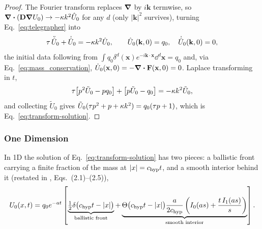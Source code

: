 \begin{proof}
The Fourier transform replaces $\grad$ by $i\mathbf k$ termwise, so
$\div(\mathbf{D}\grad U_0)\to-\kappa k^2\hat U_0$ for any $d$ (only $|\mathbf
k|^2$ survives), turning Eq.~\eqref{eq:telegrapher} into
\begin{equation}
  \tau\,\ddot{\hat U}_0 + \dot{\hat U}_0 = -\kappa k^2\hat U_0 ,
  \qquad \hat U_0(\mathbf k,0)=q_0, \quad \dot{\hat U}_0(\mathbf k,0)=0 ,
\end{equation}
the initial data following from $\int q_0\delta^d(\mathbf
x)e^{-i\mathbf k\cdot\mathbf x}\dd^d\mathbf x=q_0$ and, via
Eq.~\eqref{eq:mass_conservation}, $\dot U_0(\mathbf x,0)=-\div\mathbf{F}(\mathbf
x,0)=0$. Laplace transforming in $t$,
\begin{equation}
  \tau\big[p^2\tilde U_0-pq_0\big] + \big[p\tilde U_0-q_0\big] = -\kappa k^2\tilde U_0 ,
\end{equation}
and collecting $\tilde U_0$ gives $\tilde U_0(\tau
p^2+p+\kappa k^2)=q_0(\tau p+1)$, which is
Eq.~\eqref{eq:transform-solution}.
\end{proof}

\subsubsection{One Dimension}
\label{sec:exact-1d}

\begin{proposition}
\label{prop:exact-1d}
In 1D the solution of Eq.~\eqref{eq:transform-solution} has two pieces: a
ballistic front carrying a finite fraction of the mass at $|x|=c_{\rm hyp} t$,
and a smooth interior behind it \cite{MasoliverPorraWeiss1993} (restated in
\cite{PruestelMeierSchellersheim2013}, Eqs.~(2.1)--(2.5)),
\begin{equation}
  \label{eq:exact-green}
  U_0(x,t) = q_0e^{-at}\left[
    \underbrace{\tfrac12\delta\big(c_{\rm hyp} t-|x|\big)}_{\text{ballistic front}}
    +\underbrace{\Theta\big(c_{\rm hyp} t-|x|\big)\frac{a}{2c_{\rm hyp}}
      \left(I_0(as)+\frac{t\,I_1(as)}{s}\right)}_{\text{smooth interior}}
  \right] .
\end{equation}
\end{proposition}

